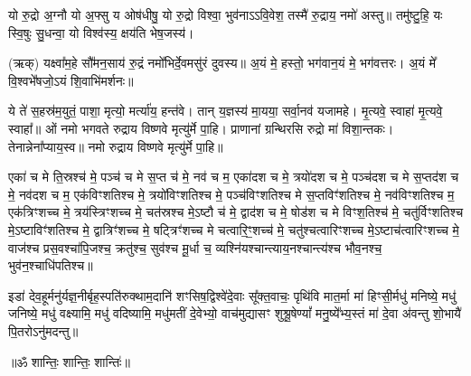 

यो रु॒द्रो अ॒ग्नौ यो अ॒फ्सु य ओष॑धीषु॒ यो रु॒द्रो विश्वा॒ भुव॑नाऽऽवि॒वेश॒ तस्मै॑ रु॒द्राय॒ नमो॑ अस्तु॥ तमु॑ष्टु॒हि॒ यः स्वि॒षुः सु॒धन्वा॒ यो विश्व॑स्य॒ क्षय॑ति भेष॒जस्य॑। 

(ऋक्)   यक्ष्वा᳚म॒हे सौ᳚मन॒साय॑ रु॒द्रं नमो᳚भिर्दे॒वमसु॑रं दुवस्य॥ अ॒यं मे॒ हस्तो॒ भग॑वान॒यं मे॒ भग॑वत्तरः। अ॒यं मे᳚ वि॒श्वभे᳚षजो॒ऽयं शि॒वाभि॑मर्शनः॥

ये ते॑ स॒हस्र॑म॒युतं॒ पाशा॒ मृत्यो॒ मर्त्या॑य॒ हन्त॑वे। तान् य॒ज्ञस्य॑ मा॒यया॒ सर्वा॒नव॑ यजामहे। मृ॒त्यवे॒ स्वाहा॑ मृ॒त्यवे॒ स्वाहा᳚॥ ओं नमो भगवते रुद्राय विष्णवे मृत्यु॑र्मे पा॒हि। प्राणानां ग्रन्थिरसि रुद्रो मा॑ विशा॒न्तकः। तेनान्नेना᳚प्याय॒स्व॥ नमो रुद्राय विष्णवे मृत्यु॑र्मे पा॒हि॥
 
एका॑ च मे ति॒स्रश्च॑ मे॒ पञ्च॑ च मे स॒प्त च॑ मे॒ नव॑ च म॒ एका॑दश च मे॒ त्रयो॑दश च मे॒ पञ्च॑दश च मे स॒प्तद॑श च मे॒ नव॑दश च म॒ एक॑विꣳशतिश्च मे॒ त्रयो॑विꣳशतिश्च मे॒ पञ्च॑विꣳशतिश्च मे स॒प्तविꣳ॑शतिश्च मे॒ नव॑विꣳशतिश्च म॒ एक॑त्रिꣳशच्च मे॒ त्रय॑स्त्रिꣳशच्च मे॒ चत॑स्रश्च मे॒ऽष्टौ च॑ मे॒ द्वाद॑श च मे॒ षोड॑श च मे विꣳश॒तिश्च॑ मे॒ चतु॑र्विꣳशतिश्च मे॒ऽष्टाविꣳ॑शतिश्च मे॒ द्वात्रिꣳ॑शच्च मे॒ षट्त्रिꣳ॑शच्च मे चत्वारि॒ꣳ॒शच्च॑ मे॒ चतु॑श्चत्वारिꣳशच्च मे॒ऽष्टाच॑त्वारिꣳशच्च मे॒ वाज॑श्च प्रस॒वश्चा॑पि॒जश्च॒ क्रतु॑श्च॒ सुव॑श्च मू॒र्धा च॒ व्यश्नि॑यश्चान्त्याय॒नश्चान्त्य॑श्च भौव॒नश्च॒ भुव॑न॒श्चाधि॑पतिश्च॥ 


\lbrack इडा॑ देव॒हूर्मनु॑र्यज्ञ॒नीर्बृह॒स्पति॑रुक्थाम॒दानि॑ शꣳसिष॒द्विश्वे॑\-दे॒वाः सू᳚क्त॒वाचः॒ पृथि॑वि मात॒र्मा मा॑ हिꣳसी॒र्मधु॑ मनिष्ये॒ मधु॑ जनिष्ये॒ मधु॑ वक्ष्यामि॒ मधु॑ वदिष्यामि॒ मधु॑मतीं दे॒वेभ्यो॒ वाच॑मुद्यासꣳ शुश्रू॒षेण्यां᳚ मनु॒ष्ये᳚भ्य॒स्तं मा॑ दे॒वा अ॑वन्तु शो॒भायै॑ पि॒तरोऽनु॑मदन्तु॥\rbrack

\centerline{॥ॐ शान्तिः॒ शान्तिः॒ शान्तिः॑॥}

{\small \closesection}
